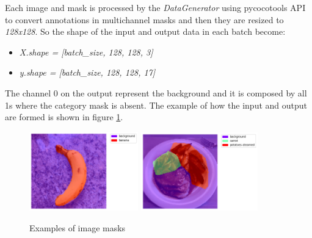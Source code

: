 \documentclass[a4paper,10pt]{report}
\begin{document}
Each image and mask is processed by the \textit{DataGenerator} using pycocotools API \cite{cocoapi} to convert annotations in multichannel masks and then they are resized to \textit{128x128}. So the shape of the input and output data in each batch become:
\begin{itemize}
    \item \emph{X.shape = [batch_size, 128, 128, 3]}
    \item \emph{y.shape = [batch_size, 128, 128, 17]}
\end{itemize}
The channel 0 on the output represent the background and it is composed by all 1s where the category
mask is absent. The example of how the input and output are formed is shown in figure \ref{fig:example_masks}.

\begin{figure}[h]
    \centering
    \includegraphics[width=0.42\textwidth]{assets/img/banana.png}
    \includegraphics[width=0.45\textwidth]{assets/img/potatoes.png}
    \caption{Examples of image masks}
    \label{fig:example_masks}
\end{figure}
\end{document}
